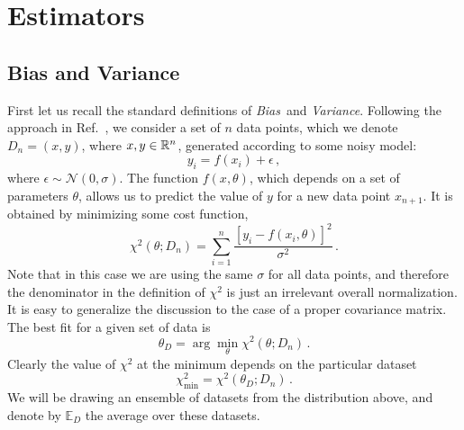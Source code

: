 \section{Estimators}
\label{sec:estimators}

\subsection{Bias and Variance}
\label{sec:BandV}

First let us recall the standard definitions of {\em Bias}\ and {\em Variance}.
Following the approach in Ref.~\cite{Mehta:2018dln}, we consider a set of $n$
data points, which we denote $D_n=\left(x,y\right)$, where $x,y \in \mathbb{R}^n$,
generated according to some noisy model:
\begin{equation}
    \label{eq:NoisyData}
    y_i = f(x_i) + \epsilon\, ,    
\end{equation}
where $\epsilon\sim\mathcal{N}(0,\sigma)$. The function $f(x,\theta)$, which
depends on a set of parameters $\theta$, allows us to predict the value of $y$
for a new data point $x_{n+1}$. It is obtained by minimizing some cost function,
\eg
\begin{equation}
    \label{eq:CostFuncChi}
    \chi^2(\theta; D_n) = \sum_{i=1}^n 
    \frac{\left[
        y_i - f(x_i,\theta)
    \right]^2}{\sigma^2}\, . 
\end{equation}
Note that in this case we are using the same $\sigma$ for all data points, and
therefore the denominator in the definition of $\chi^2$ is just an irrelevant
overall normalization. It is easy to generalize the discussion to the case of a
proper covariance matrix. The best fit for a given set of data is 
\begin{equation}
    \label{eq:ThetaMin}
    \theta_D = \arg\min_\theta \chi^2(\theta; D_n)\, .
\end{equation} 
Clearly the value of $\chi^2$ at the minimum depends on the particular dataset
\begin{equation}
    \label{eq:ChiAtMin}
    \chi^2_\mathrm{min}=\chi^2(\theta_D; D_n)\, . 
\end{equation}
We will be drawing an ensemble of datasets from the distribution above, and denote by $\mathbb{E}_D$ the average over these datasets.

